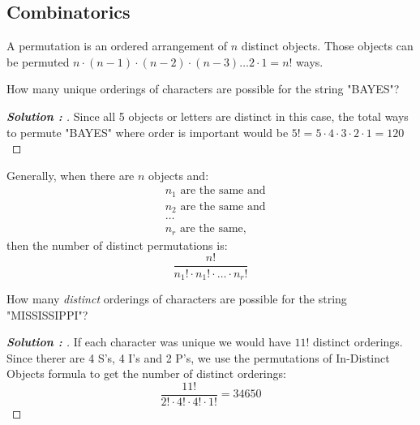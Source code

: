 \documentclass[11pt]{article}
\newenvironment{solution}[1][]{%
  \renewcommand\qedsymbol{$\blacksquare$}%
  \def\temp{\normalfont\bfseries Solution \theexample: #1}
  \begin{proof}[\temp]
  \normalfont %
}{%
  \end{proof}
}
\begin{document}
\subsection{Combinatorics}

\begin{definition}
    A permutation is an ordered arrangement of $n$ distinct objects. Those objects can be permuted
    $n \cdot (n-1) \cdot (n-2) \cdot (n-3) \dots 2 \cdot 1 = n!$ ways.
\end{definition}
\begin{example}
    How many unique orderings of characters are possible for the string "BAYES"?
\end{example}
\begin{solution}
    Since all 5 objects or letters are distinct in this case, the total ways to permute "BAYES" where order is important would be
    $5! = 5 \cdot 4 \cdot 3 \cdot 2 \cdot 1 = 120$
\end{solution}

\begin{definition}
  \label{set:Permutations-of-In-Distinct-Objects}
    Generally, when there are $n$ objects and:
    \begin{align*}
        &n_{1} \text{ are the same and}\\
        &n_{2} \text{ are the same and}\\
        &\dots\\
        &n_{r} \text{ are the same,}
    \end{align*}
    then the number of distinct permutations is: $$\frac{n!}{n_{1}! \cdot n_{1}! \cdot \dots \cdot n_{r}!}$$
\end{definition}
\begin{example}
  How many \textit{distinct} orderings of characters are possible for the string\\"MISSISSIPPI"?
\end{example}
\begin{solution}
  If each character was unique we would have $11!$ distinct orderings. Since therer are 4 S's, 4 I's and 2 P's, we use the permutations of In-Distinct
  Objects formula to get the number of distinct orderings:
  $$
    \frac{11!}{2! \cdot 4! \cdot 4! \cdot 1!} = 34650
  $$
\end{solution}
\end{document}
